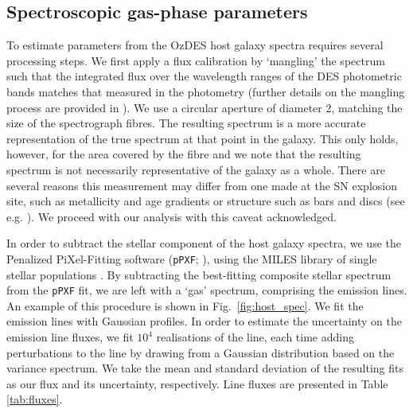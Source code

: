 \documentclass[fleqn,usenatbib,]{mnras}
\begin{document}
\subsection{Spectroscopic gas-phase parameters \label{subsec:linefit}}

To estimate parameters from the OzDES host galaxy spectra requires several processing steps. We first apply a flux calibration by `mangling' the spectrum such that the integrated flux over the wavelength ranges of the DES photometric bands matches that measured in the photometry (further details on the mangling process are provided in \citealt{Swann2020}). We use a circular aperture of diameter 2\arcsec, matching the size of the spectrograph fibres. The resulting spectrum is a more accurate representation of the true spectrum at that point in the galaxy. This only holds, however, for the area covered by the fibre and we note that the resulting spectrum is not necessarily representative of the galaxy as a whole. There are several reasons this measurement may differ from one made at the SN explosion site, such as metallicity and age gradients or structure such as bars and discs (see e.g. \citealt{Iglesias-Paramo2013,Iglesias-Paramo2016}). We proceed with our analysis with this caveat acknowledged.

In order to subtract the stellar component of the host galaxy spectra, we use the Penalized PiXel-Fitting software (\texttt{pPXF}; \citealt{Cappellari2004,Cappellari2012,Cappellari2017}), using the MILES library of single stellar populations \citep{Vazdekis2010}. By subtracting the best-fitting composite stellar spectrum from the \texttt{pPXF} fit, we are left with a `gas' spectrum, comprising the emission lines. An example of this procedure is shown in Fig.~\ref{fig:host_spec}. We fit the emission lines with Gaussian profiles. In order to estimate the uncertainty on the emission line fluxes, we fit $10^4$ realisations of the line, each time adding perturbations to the line by drawing from a Gaussian distribution based on the variance spectrum. We take the mean and standard deviation of the resulting fits as our flux and its uncertainty, respectively. Line fluxes are presented in Table \ref{tab:fluxes}.
\end{document}
